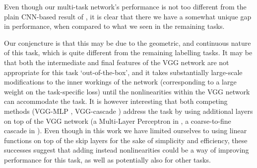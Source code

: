 \documentclass[10pt,twocolumn,letterpaper]{article}
\begin{document}
 
Even though our multi-task network's performance  is not too different from the plain CNN-based result of \cite{WangFG15}, it is clear that there we have a somewhat unique gap in performance, when compared to what we seen in the remaining tasks. 

 Our conjencture is that this may be due to the geometric, and continuous nature of this task, which is quite different from the remaining labelling tasks. It may be that both the intermediate and final features of the VGG network are not  appropriate for this task `out-of-the-box', and it takes substantially large-scale modifications to the inner workings of the network (corresponding to a large weight on the task-specific loss) until the nonlinearities within the VGG network can accommodate the task. It is however interesting that both competing methods (VGG-MLP \cite{BansalRG16}, VGG-cascade \cite{Eigen15}) address the task by using additional layers on top of the VGG network (a Multi-Layer Perceptron in \cite{BansalRG16}, a coarse-to-fine cascade in \cite{Eigen15}). Even though in this work we have limited ourselves to using linear functions on top of the skip layers for the sake of simplicity and efficiency, these successes suggest that adding instead nonlinearities could be a way of improving performance for this task, as well as potentially also for other tasks. 
  
 
 
 
 

 






\end{document}
